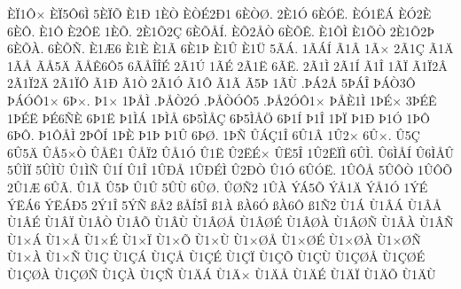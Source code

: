 {^^c8^^cf1^^d4^^d7
^^c8^^cf5^^d46^^cc
5^^c8^^cf^^d5
^^c81^^d0
1^^c8^^d2
^^c8^^d2^^c92^^d01
6^^c8^^d2^^d8.
2^^c81^^d3
6^^c8^^d3^^cb.
^^c8^^d31^^cb^^c1
^^c8^^d32^^c8
6^^c8^^d4.
^^c81^^d4
^^c82^^d4^^cb
1^^c8^^d5.
2^^c81^^d52^^c7
6^^c8^^d5^^c5^^cd.
^^c8^^d52^^c5^^d2
6^^c8^^d5^^ca.
^^c81^^d5^^cc
^^c81^^d5^^d2
2^^c81^^d52^^de
6^^c8^^d5^^c0.
6^^c8^^d5^^d1.
^^c81^^c66
^^c81^^c8
^^c81^^c3
6^^c81^^de
^^c81^^db
^^c81^^dc
5^^c3^^c1.
1^^c3^^c1^^cd
^^c31^^c2
1^^c3^^d7
2^^c31^^c7
^^c31^^c4
1^^c3^^c5
^^c3^^c55^^c4
^^c3^^c5^^ca6^^d45
6^^c3^^c5^^ce^^ce^^c9
2^^c31^^da
1^^c3^^c9
2^^c31^^cb
6^^c3^^cb.
2^^c31^^cc
2^^c31^^cd
^^c31^^ce
1^^c3^^cf
^^c31^^cf2^^c2
2^^c31^^cf2^^c4
2^^c31^^cf^^d4
^^c31^^d0
^^c31^^d2
2^^c31^^d3
^^c31^^d4
^^c31^^c3
^^c35^^de
1^^c3^^d9
.^^de^^c12^^c5
5^^de^^c1^^ce
^^de^^c1^^d23^^d4
^^de^^c1^^d3^^d41^^d7
6^^de^^d7.
^^de1^^d7
1^^de^^c5^^cc
.^^de^^c5^^d22^^d3
.^^de^^c5^^d2^^d3^^d45
.^^de^^c52^^d3^^d41^^d7
^^de^^c5^^c81^^cc
1^^de^^c9^^d7
3^^de^^c9^^ca
1^^de^^c9^^cb
^^de^^c96^^d1^^c8
6^^de1^^cb
^^de1^^cc^^c1
1^^de^^cc^^c5
6^^de5^^cc^^c5^^c7
6^^de5^^cc^^c5^^d6
6^^de1^^cd
^^de1^^ce
1^^de^^cf
^^de1^^d0
^^de1^^d3
1^^de^^d4
6^^de^^d4.
^^de1^^d4^^c5^^cc
2^^de^^d4^^cd
1^^de^^c8
^^de1^^de
^^de1^^db
6^^de^^d8.
1^^de^^d1
^^db^^c1^^c71^^ce
6^^db1^^c2
1^^db2^^d7
6^^db^^d7.
^^db5^^c7
6^^db5^^c4
^^db^^c55^^d7^^d2
^^db^^c5^^cb1
^^db^^c5^^cf2
^^db^^c51^^d3
^^db1^^cb
^^db2^^cb^^c9^^d7
^^db^^cb5^^ce
1^^db2^^cb^^cf^^cc
6^^db^^cc.
^^db6^^cc^^c5^^cd
^^db6^^cc^^c5^^db
5^^db^^cc^^cf
5^^db^^cc^^d9
^^db1^^cc^^d1
^^db1^^cd
^^db1^^ce
1^^db^^d0^^c5
1^^db^^d0^^c9^^cc
^^db2^^d0^^d2
^^db1^^d3
6^^db^^d3^^cb.
1^^db^^d4^^c5
5^^db^^d4^^d2
1^^db^^d4^^d5
2^^db1^^c6
6^^db^^c3.
^^db1^^c3
^^db5^^de
^^db1^^db
5^^db^^d9
6^^db^^d8.
^^db^^d8^^d12
1^^db^^c0
^^dd^^c15^^d5
^^dd^^c51^^c4
^^dd^^c51^^d3
1^^dd^^c9
^^dd^^cb^^c16
^^dd^^cb^^c1^^d05
2^^dd1^^ce
5^^dd^^d1
^^df^^c52
^^df^^c5^^cd5^^ce
^^df1^^c0
^^df^^c06^^d3
^^df^^c06^^d4
^^df1^^d12
^^d91^^c1
^^d91^^c2^^c1
^^d91^^c2^^c5
^^d91^^c2^^c9
^^d91^^c2^^cf
^^d91^^c2^^d2
^^d91^^c2^^d5
^^d91^^c2^^d9
^^d91^^c2^^d8^^c5
^^d91^^c2^^d8^^c9
^^d91^^c2^^d8^^c0
^^d91^^c2^^d8^^d1
^^d91^^c2^^c0
^^d91^^c2^^d1
^^d91^^d7^^c1
^^d91^^d7^^c5
^^d91^^d7^^c9
^^d91^^d7^^cf
^^d91^^d7^^d5
^^d91^^d7^^d9
^^d91^^d7^^d8^^c5
^^d91^^d7^^d8^^c9
^^d91^^d7^^d8^^c0
^^d91^^d7^^d8^^d1
^^d91^^d7^^c0
^^d91^^d7^^d1
^^d91^^c7
^^d91^^c7^^c1
^^d91^^c7^^c5
^^d91^^c7^^c9
^^d91^^c7^^cf
^^d91^^c7^^d5
^^d91^^c7^^d9
^^d91^^c7^^d8^^c5
^^d91^^c7^^d8^^c9
^^d91^^c7^^d8^^c0
^^d91^^c7^^d8^^d1
^^d91^^c7^^c0
^^d91^^c7^^d1
^^d91^^c4^^c1
^^d91^^c4^^d7
^^d91^^c4^^c5
^^d91^^c4^^c9
^^d91^^c4^^cf
^^d91^^c4^^d5
^^d91^^c4^^d9
}
